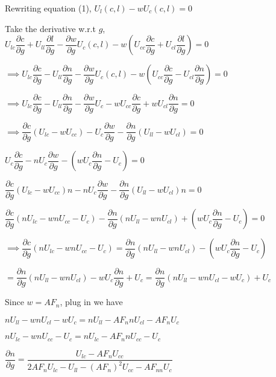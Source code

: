 \documentclass{article}
\begin{document}
Rewriting equation (1), $U_{l}\left(c,l\right)-wU_{c}\left(c,l\right)=0$

Take the derivative w.r.t $g$, \\

$U_{lc}\dfrac{\partial c}{\partial g}+U_{ll}\dfrac{\partial l}{\partial g}-\dfrac{\partial w}{\partial g}U_{c}\left(c,l\right)-w\left(U_{cc}\dfrac{\partial c}{\partial g}+U_{cl}\dfrac{\partial l}{\partial g}\right)=0$

$\implies U_{lc}\dfrac{\partial c}{\partial g}-U_{ll}\dfrac{\partial n}{\partial g}-\dfrac{\partial w}{\partial g}U_{c}\left(c,l\right)-w\left(U_{cc}\dfrac{\partial c}{\partial g}-U_{cl}\dfrac{\partial n}{\partial g}\right)=0$

$\implies U_{lc}\dfrac{\partial c}{\partial g}-U_{ll}\dfrac{\partial n}{\partial g}-\dfrac{\partial w}{\partial g}U_{c}-wU_{cc}\dfrac{\partial c}{\partial g}+wU_{cl}\dfrac{\partial n}{\partial g}=0$

$\implies\dfrac{\partial c}{\partial g}\left(U_{lc}-wU_{cc}\right)-U_{c}\dfrac{\partial w}{\partial g}-\dfrac{\partial n}{\partial g}\left(U_{ll}-wU_{cl}\right)=0 $

$U_{c}\dfrac{\partial c}{\partial g}-nU_{c}\dfrac{\partial w}{\partial g}-\left(wU_{c}\dfrac{\partial n}{\partial g}-U_{c}\right)=0$

$\dfrac{\partial c}{\partial g}\left(U_{lc}-wU_{cc}\right)n-nU_{c}\dfrac{\partial w}{\partial g}-\dfrac{\partial n}{\partial g}\left(U_{ll}-wU_{cl}\right)n=0 $

$\dfrac{\partial c}{\partial g}\left(nU_{lc}-wnU_{cc}-U_{c}\right)-\dfrac{\partial n}{\partial g}\left(nU_{ll}-wnU_{cl}\right)+\left(wU_{c}\dfrac{\partial n}{\partial g}-U_{c}\right)=0$

$\implies \dfrac{\partial c}{\partial g}\left(nU_{lc}-wnU_{cc}-U_{c}\right)=\dfrac{\partial n}{\partial g}\left(nU_{ll}-wnU_{cl}\right)-\left(wU_{c}\dfrac{\partial n}{\partial g}-U_{c}\right)$

$=\dfrac{\partial n}{\partial g}\left(nU_{ll}-wnU_{cl}\right)-wU_{c}\dfrac{\partial n}{\partial g}+U_{c}=\dfrac{\partial n}{\partial g}\left(nU_{ll}-wnU_{cl}-wU_{c}\right)+U_{c}$

Since $w=AF_{n}$, plug in we have

$nU_{ll}-wnU_{cl}-wU_{c}=nU_{ll}-AF_{n}nU_{cl}-AF_{n}U_{c}$

$nU_{lc}-wnU_{cc}-U_{c}=nU_{lc}-AF_{n}nU_{cc}-U_{c}$

$\dfrac{\partial n}{\partial g}=\dfrac{U_{lc}-AF_{n}U_{cc}}{2AF_{n}U_{lc}-U_{ll}-\left(AF_{n}\right)^2U_{cc}-AF_{nn}U_{c}}$
\end{document}
